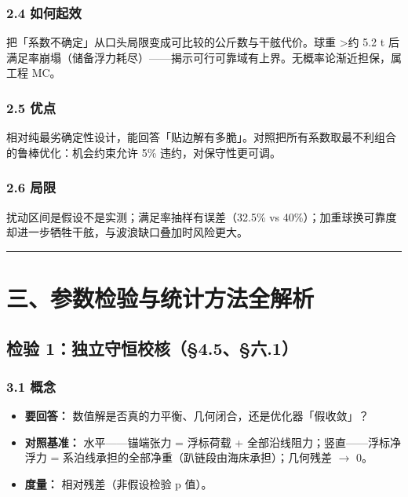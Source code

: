 \documentclass[UTF8,a4paper,zihao=-4]{ctexart}
\begin{document}
\subsubsection{\texorpdfstring{2.4 如何起效}{2.4 如何起效}}
把「系数不确定」从口头局限变成可比较的公斤数与干舷代价。球重 >约 5.2 t 后满足率崩塌（储备浮力耗尽）------揭示可行可靠域有上界。无概率论渐近担保，属工程 MC。

\subsubsection{\texorpdfstring{2.5 优点}{2.5 优点}}
相对纯最劣确定性设计，能回答「贴边解有多脆」。对照把所有系数取最不利组合的鲁棒优化：机会约束允许 5\% 违约，对保守性更可调。

\subsubsection{\texorpdfstring{2.6 局限}{2.6 局限}}
扰动区间是假设不是实测；满足率抽样有误差（32.5\% vs 40\%）；加重球换可靠度却进一步牺牲干舷，与波浪缺口叠加时风险更大。

\vspace{0.4em}\hrule\vspace{0.4em}

\section{\texorpdfstring{三、参数检验与统计方法全解析}{三、参数检验与统计方法全解析}}

\subsection{\texorpdfstring{检验 1：独立守恒校核（§4.5、§六.1）}{检验 1：独立守恒校核（§4.5、§六.1）}}

\subsubsection{\texorpdfstring{3.1 概念}{3.1 概念}}
\begin{itemize}[leftmargin=1.5em]
\item \textbf{要回答：} 数值解是否真的力平衡、几何闭合，还是优化器「假收敛」？
\item \textbf{对照基准：} 水平------锚端张力 = 浮标荷载 + 全部沿线阻力；竖直------浮标净浮力 = 系泊线承担的全部净重（趴链段由海床承担）；几何残差 $\rightarrow$ 0。
\item \textbf{度量：} 相对残差（非假设检验 p 值）。
\end{itemize}
\end{document}
